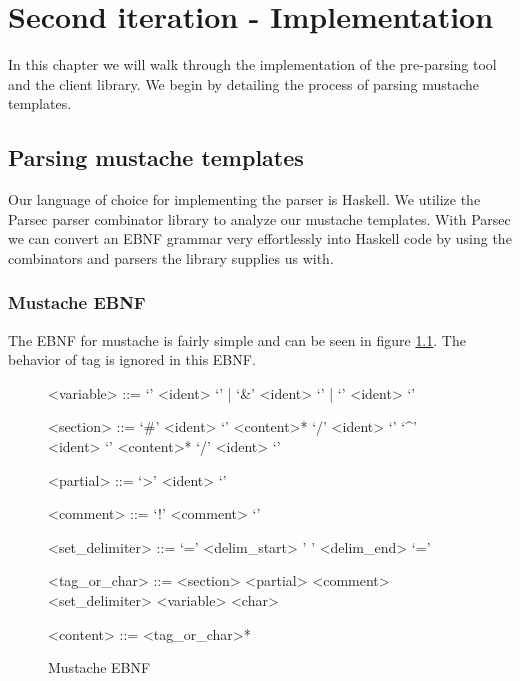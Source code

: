 \chapter{Second iteration - Implementation}
\label{chap:impl}

In this chapter we will walk through the implementation of the pre-parsing tool
and the client library. We begin by detailing the process of parsing
mustache templates.

\section{Parsing mustache templates}

Our language of choice for implementing the parser is Haskell.
We utilize the Parsec parser combinator library to analyze our mustache
templates. With Parsec we can convert an EBNF grammar very effortlessly
into Haskell code by using the combinators and parsers the library supplies
us with.

\subsection{Mustache EBNF}
The EBNF for mustache is fairly simple and can be seen in figure
\ref{fig:mustache.ebnf}.
The behavior of  tag is ignored in this EBNF.

\begin{figure}
	\centering
	\caption{Mustache EBNF}
	\label{fig:mustache.ebnf}
	\begin{grammar}
<variable> ::= `{{{' <ident> `}}}' | `{{&' <ident> `}}' | `{{' <ident> `}}'

<section> ::= `{{#' <ident> `}}' <content>* `{{/' <ident> `}}'
         \alt `{{^' <ident> `}}' <content>* `{{/' <ident> `}}'

<partial> ::= `{{>' <ident> `}}'

<comment> ::= `{{!' <comment> `}}'

<set\_delimiter> ::= `{{=' <delim\_start>  ' ' <delim\_end> `=}}'

<tag\_or\_char> ::= <section>
               \alt <partial>
               \alt <comment>
               \alt <set\_delimiter>
               \alt <variable>
               \alt <char>

<content> ::= <tag\_or\_char>*
	\end{grammar}
\end{figure}

